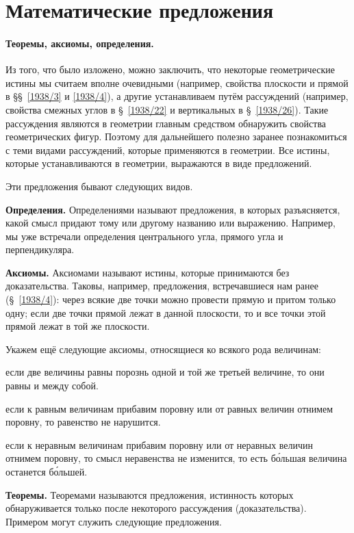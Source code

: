 \documentclass[oneside]{book}
\begin{document}
\section{Математические предложения}



\paragraph{Теоремы, аксиомы, определения.}\label{1938/28}
Из того, что было изложено, можно заключить, что некоторые геометрические истины мы считаем вполне очевидными (например, свойства плоскости и прямой в §§~\ref{1938/3} и \ref{1938/4}), а другие устанавливаем путём рассуждений (например, свойства смежных углов в §~\ref{1938/22} и вертикальных в §~\ref{1938/26}).
Такие рассуждения являются в геометрии главным средством обнаружить свойства геометрических фигур.
Поэтому для дальнейшего полезно заранее познакомиться с теми видами рассуждений, которые применяются в геометрии.
Все истины, которые устанавливаются в геометрии, выражаются в виде предложений.

Эти предложения бывают следующих видов.

\textbf{Определения.}
Определениями называют предложения, в которых разъясняется, какой смысл придают тому или другому названию или выражению.
Например, мы уже встречали определения центрального угла, прямого угла и перпендикуляра.

\textbf{Аксиомы.}
Аксиомами называют истины, которые принимаются без доказательства.
Таковы, например, предложения, встречавшиеся нам ранее (§~\ref{1938/4}):
через всякие две точки можно провести прямую и притом только одну;
если две точки прямой лежат в данной плоскости, то и все точки этой прямой лежат в той же плоскости.

Укажем ещё следующие аксиомы, относящиеся ко всякого рода величинам:

если две величины равны порознь одной и той же третьей величине, то они равны и между собой.

если к равным величинам прибавим поровну или от равных величин отнимем поровну, то равенство не нарушится.

если к неравным величинам прибавим поровну или от неравных величин отнимем поровну, то смысл неравенства не изменится, то есть б\'{о}льшая величина останется б\'{о}льшей.

\textbf{Теоремы.}
Теоремами называются предложения, истинность которых обнаруживается только после некоторого рассуждения (доказательства).
Примером могут служить следующие предложения.
\end{document}
